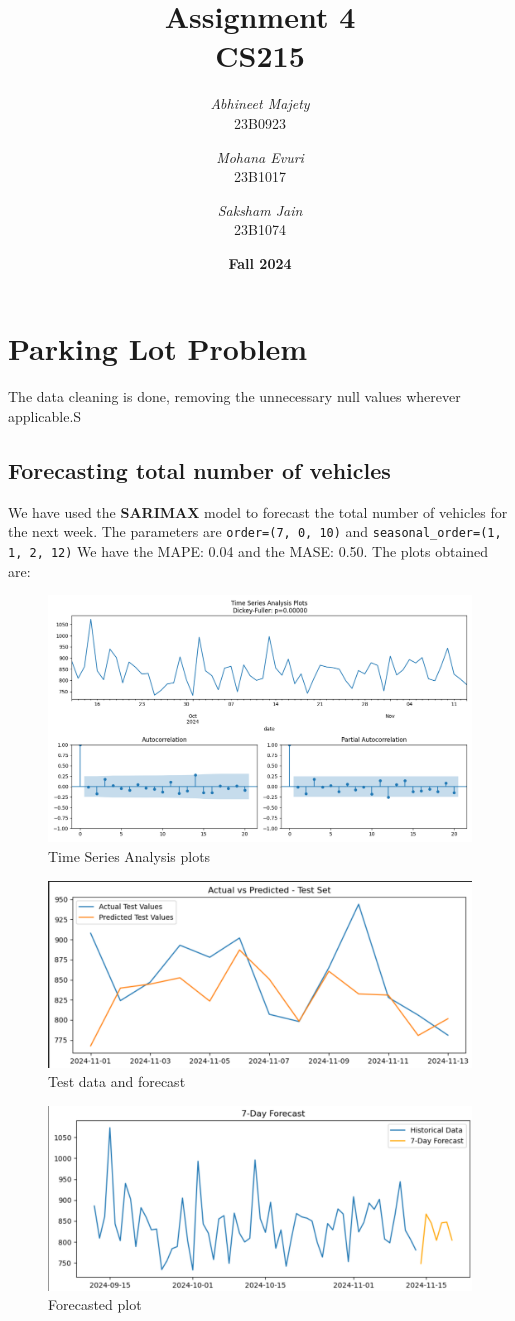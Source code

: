 \documentclass{article}
\title{\textbf{\huge Assignment 4 \\[10pt] \LARGE CS215}}
\author{
    \textit{Abhineet Majety} \\
    23B0923
    \and
    \textit{Mohana Evuri} \\
    23B1017
    \and
    \textit{Saksham Jain} \\
    23B1074
    \\[10pt]
}
\date{\Large \textbf{Fall 2024}}
\begin{document}
\maketitle

\section{Parking Lot Problem}

The data cleaning is done, removing the unnecessary null values wherever applicable.S

\subsection{Forecasting total number of vehicles}

We have used the \textbf{SARIMAX} model to forecast the total number of vehicles for the next week. The parameters are \texttt{order=(7, 0, 10)} and \texttt{seasonal\_order=(1, 1, 2, 12)}
We have the MAPE: 0.04 and the MASE: 0.50. The plots obtained are:

\begin{figure}[H]
    \centering
    \includegraphics[width=0.5\linewidth]{1a_acf_pacf.png}
    \caption{Time Series Analysis plots}
\end{figure}

\begin{figure}[H]
    \centering
    \includegraphics[width=0.5\linewidth]{Screenshot 2024-10-29 004452.png}
    \caption{Test data and forecast}
\end{figure}

\begin{figure}[H]
    \centering
    \includegraphics[width=0.5\linewidth]{Screenshot 2024-10-29 004701.png}
    \caption{Forecasted plot}
\end{figure}
\end{document}
